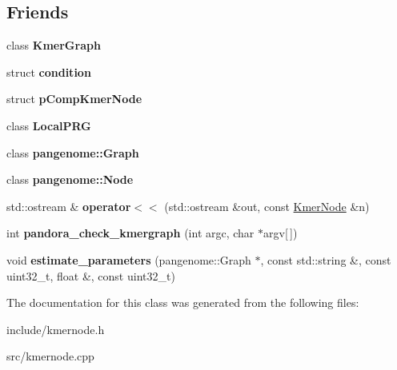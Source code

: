 \subsection*{Friends}
\begin{DoxyCompactItemize}
\item 
\mbox{\label{classKmerNode_ad2a6e04a3dd7a2a1dd34b4bfaf5e1c08}} 
class {\bfseries Kmer\+Graph}
\item 
\mbox{\label{classKmerNode_ab27a87abadfae7a133147398c76b360e}} 
struct {\bfseries condition}
\item 
\mbox{\label{classKmerNode_ae1131d7732276a4a67ac1ee3dece65b9}} 
struct {\bfseries p\+Comp\+Kmer\+Node}
\item 
\mbox{\label{classKmerNode_a99a72d107e31f7e3824a18ff7af2fbc5}} 
class {\bfseries Local\+P\+RG}
\item 
\mbox{\label{classKmerNode_a76d982a83e79ef4ca90325cebf712a72}} 
class {\bfseries pangenome\+::\+Graph}
\item 
\mbox{\label{classKmerNode_a192924a654cf94123b9475a18c1f415c}} 
class {\bfseries pangenome\+::\+Node}
\item 
\mbox{\label{classKmerNode_afaa5f1e3847e51ca39dca22a7c962978}} 
std\+::ostream \& {\bfseries operator$<$$<$} (std\+::ostream \&out, const \hyperlink{classKmerNode}{Kmer\+Node} \&n)
\item 
\mbox{\label{classKmerNode_a258eb984857712d7250ac6a109cb7f49}} 
int {\bfseries pandora\+\_\+check\+\_\+kmergraph} (int argc, char $\ast$argv\mbox{[}$\,$\mbox{]})
\item 
\mbox{\label{classKmerNode_ae11754c9f5044475e2bc98ef99221d59}} 
void {\bfseries estimate\+\_\+parameters} (pangenome\+::\+Graph $\ast$, const std\+::string \&, const uint32\+\_\+t, float \&, const uint32\+\_\+t)
\end{DoxyCompactItemize}


The documentation for this class was generated from the following files\+:\begin{DoxyCompactItemize}
\item 
include/kmernode.\+h\item 
src/kmernode.\+cpp\end{DoxyCompactItemize}
